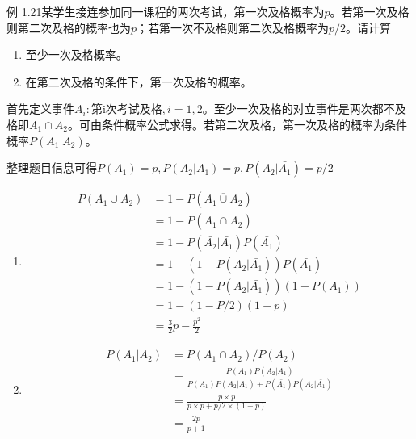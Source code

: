 \documentclass{beamer}
\begin{document}
	\begin{frame}
		例 1.21某学生接连参加同一课程的两次考试，第一次及格概率为$p$。若第一次及格则第二次及格的概率也为$p$；若第一次不及格则第二次及格概率为$p / 2$。请计算
		\begin{enumerate}
			\item 至少一次及格概率。
			\item 在第二次及格的条件下，第一次及格的概率。
		\end{enumerate}
	\end{frame}
	
	\begin{frame}
		首先定义事件$A_i: \text{第i次考试及格}, i = 1, 2$。至少一次及格的对立事件是两次都不及格即$A_1 \cap A_2$。可由条件概率公式求得。若第二次及格，第一次及格的概率为条件概率$P(A_1 | A_2)$。
		
		\vspace*{1cm}
		整理题目信息可得$P(A_1) = p, P(A_2 | A_1) = p, P(A_2 | \bar{A_1}) = p /2 $
		\begin{enumerate}
			\item \begin{align}
				P(A_1 \cup A_2) & = 1 - P(\overline{A_1 \cup A_2}) \\
				& = 1 - P(\bar{A_1} \cap \bar{A_2}) \\
				& = 1 - P(\bar{A_2} | \bar{A_1})P(\bar{A_1}) \\
				& = 1 - (1 - P(A_2 | \bar{A_1}))P(\bar{A_1})  \\ 
				& = 1 - (1 - P(A_2 | \bar{A_1}))(1 - P(A_1)) \\
				& = 1 - (1 - P / 2)(1 - p) \\
				& = \frac{3}{2}p - \frac{p ^ 2}{2}
			\end{align}
		\end{enumerate}
	\end{frame}
	
	\begin{frame}
		\begin{enumerate}\setcounter{enumi}{1}
			\item \begin{align}
				P(A_1 | A_2) & = P(A_1 \cap A_2) / P(A_2) \\
				& = \frac{P(A_1)P(A_2 |A_1)}{P(A_1)P(A_2 |A_1) + P(\bar{A_1})P(A_2 |\bar{A_1})} \\
				& = \frac{p \times p}{p \times p + p / 2 \times(1 - p)} \\
				& = \frac{2p}{p + 1}
			\end{align}
		\end{enumerate}
	\end{frame}
	
\end{document}
